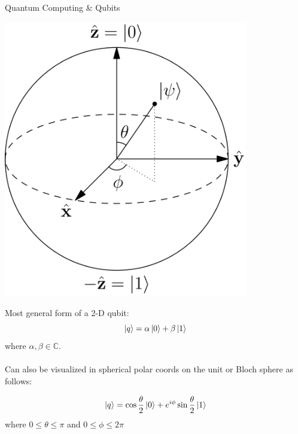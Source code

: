 \documentclass[10pt]{beamer}
\begin{document}
\appendix
{
\begin{frame}[fragile]{Quantum Computing \& Qubits}

\begin{minipage}[c]{.5\textwidth}
		\hspace{2mm}
       \includegraphics[width=0.8\textwidth]{blochsphere.png}
       \captionsetup{justification=raggedright, singlelinecheck=false}
\end{minipage}%
\begin{minipage}[c][][b]{.5\textwidth}
Most general form of a 2-D qubit:
\begin{equation}
\label{equ: blochqubit}
\ket{q} = \alpha \ket{0} + \beta \ket{1}
\end{equation}
where $\alpha,\beta \in \mathbb{C}$.\\
\\
Can also be visualized in spherical polar coords on the unit or Bloch sphere as follows: 

\begin{equation}
\label{equ: blochqubit}
\ket{q} = \cos\frac{\theta}{2} \ket{0} + e^{i \phi} \sin\frac{\theta}{2} \ket{1}
\end{equation}
where $0 \leq \theta \leq \pi$ and $0 \leq \phi \leq 2\pi$
\null
\par\xdef\tpd{\the\prevdepth}
\end{minipage}


\end{frame}
}
\end{document}
